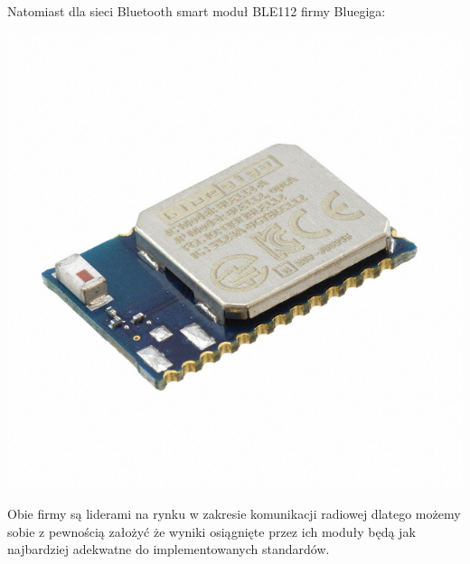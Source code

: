 Natomiast dla sieci Bluetooth smart moduł BLE112 firmy Bluegiga:

\centerline{\includegraphics[scale=0.20]{./img/target_system/BLE112-module.jpg}} 

Obie firmy są liderami na rynku w zakresie komunikacji radiowej dlatego możemy sobie z pewnością założyć że wyniki osiągnięte przez ich moduły będą jak najbardziej adekwatne do implementowanych standardów.

\clearpage
